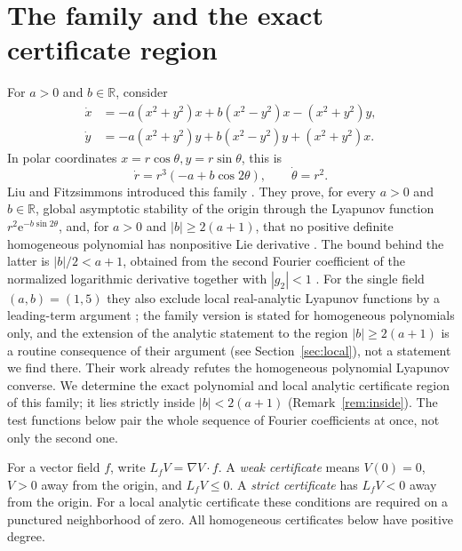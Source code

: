 \documentclass[11pt]{article}
\theoremstyle{remark}\newtheorem{remark}[theorem]{Remark}
\newcommand{\R}{\mathbb R}
\newcommand{\ee}{\mathrm e}
\begin{document}
\section{The family and the exact certificate region}
For \(a>0\) and \(b\in\R\), consider
\begin{equation}\label{eq:field}
 \begin{aligned}
 \dot x&=-a(x^2+y^2)x+b(x^2-y^2)x-(x^2+y^2)y,\\
 \dot y&=-a(x^2+y^2)y+b(x^2-y^2)y+(x^2+y^2)x .
 \end{aligned}
\end{equation}
In polar coordinates \(x=r\cos\theta,y=r\sin\theta\), this is
\begin{equation}\label{eq:polar}
 \dot r=r^3(-a+b\cos2\theta),\qquad \dot\theta=r^2 .
\end{equation}
Liu and Fitzsimmons introduced this family \cite[Sec.~IV-D]{liu}.
They prove, for every \(a>0\) and \(b\in\R\), global asymptotic
stability of the origin through the Lyapunov function
\(r^2\ee^{-b\sin2\theta}\), and, for \(a>0\) and \(|b|\ge2(a+1)\), that
no positive definite homogeneous polynomial has nonpositive Lie
derivative \cite[Theorem IV.3]{liu}. The bound behind the latter is
\(|b|/2<a+1\), obtained from the second Fourier coefficient of the
normalized logarithmic derivative together with \(|g_2|<1\)
\cite[Lemma III.3]{liu}. For the single field \((a,b)=(1,5)\)
they also exclude local real-analytic Lyapunov functions by a
leading-term argument \cite[Theorem II.2(4), Sec.~III-D]{liu}; the
family version \cite[Theorem IV.3]{liu} is stated for homogeneous
polynomials only, and the extension of the analytic statement to the
region \(|b|\ge2(a+1)\) is a routine consequence of their argument
(see Section~\ref{sec:local}), not a statement we find there. Their work
already refutes the homogeneous polynomial Lyapunov converse. We
determine the exact polynomial and local analytic certificate region of
this family; it lies strictly inside \(|b|<2(a+1)\) (Remark~\ref{rem:inside}).
The test functions below pair the whole sequence of Fourier
coefficients at once, not only the second one.

For a vector field \(f\), write \(L_fV=\nabla V\cdot f\).
A \emph{weak certificate} means \(V(0)=0\), \(V>0\) away from the
origin, and \(L_fV\le0\). A \emph{strict certificate} has
\(L_fV<0\) away from the origin. For a local analytic certificate
these conditions are required on a punctured neighborhood of zero.
All homogeneous certificates below have positive degree.
\end{document}

